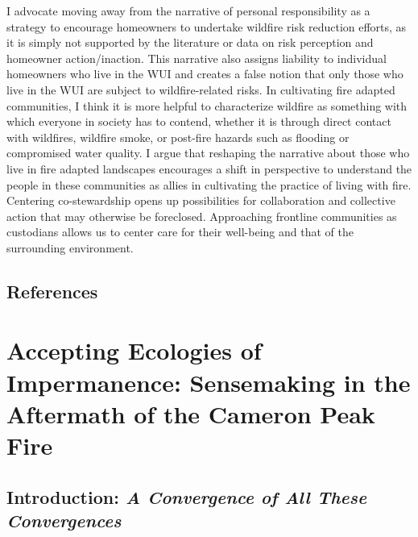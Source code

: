\documentclass[
]{article}
\begin{document}
I advocate moving away from the narrative of personal responsibility as a strategy to encourage homeowners to undertake wildfire risk reduction efforts, as it is simply not supported by the literature or data on risk perception and homeowner action/inaction. This narrative also assigns liability to individual homeowners who live in the WUI and creates a false notion that only those who live in the WUI are subject to wildfire-related risks. In cultivating fire adapted communities, I think it is more helpful to characterize wildfire as something with which everyone in society has to contend, whether it is through direct contact with wildfires, wildfire smoke, or post-fire hazards such as flooding or compromised water quality. I argue that reshaping the narrative about those who live in fire adapted landscapes encourages a shift in perspective to understand the people in these communities as allies in cultivating the practice of living with fire. Centering co-stewardship opens up possibilities for collaboration and collective action that may otherwise be foreclosed. Approaching frontline communities as custodians allows us to center care for their well-being and that of the surrounding environment.

\subsection{References}\label{references-2}

\clearpage

\section{Accepting Ecologies of Impermanence: Sensemaking in the Aftermath of the Cameron Peak Fire}\label{accepting-ecologies-of-impermanence-sensemaking-in-the-aftermath-of-the-cameron-peak-fire}

\renewcommand{\thefigure}{4.\arabic{figure}}
\setcounter{figure}{0}
\renewcommand{\thetable}{4.\arabic{table}}
\setcounter{table}{0}
\renewcommand{\theequation}{4.\arabic{equation}}
\setcounter{equation}{0}

\subsection{\texorpdfstring{Introduction: \emph{A Convergence of All These Convergences}}{Introduction: A Convergence of All These Convergences}}\label{introduction-a-convergence-of-all-these-convergences}
\end{document}
